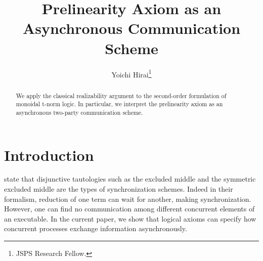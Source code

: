 \documentclass[envcountsame]{llncs}
\title{Prelinearity Axiom as an Asynchronous Communication Scheme}
\author{Yoichi Hirai\thanks{JSPS Research Fellow.}}
\institute{The University of Tokyo \email{yh@is.s.u-tokyo.ac.jp}}
\begin{document}
\maketitle
\begin{abstract}
 We apply the classical realizability argument to the second-order
 formulation of monoidal t-norm logic.
 In particular, we interpret the
 prelinearity axiom as an asynchronous two-party communication scheme.
\end{abstract}


\section{Introduction}
\citet{danos-krivine} state that
disjunctive tautologies
such as the excluded middle and the symmetric excluded middle
are the types of synchronization schemes.
Indeed in their formalism, reduction of one term can wait
for another, making synchronization.
However,
one can find no communication among different
concurrent elements of an executable.
In the current paper, we show that logical axioms can specify how
concurrent processes exchange information asynchronously.
\end{document}
